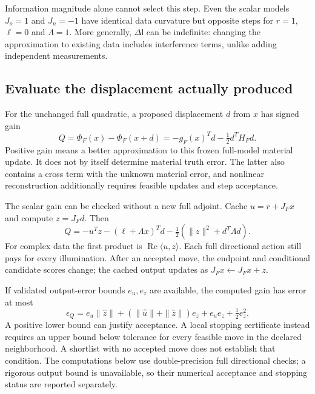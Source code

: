 Information magnitude alone cannot select this step. Even the scalar models $J_o=1$ and $J_n=-1$ have identical data curvature but opposite steps for $r=1$, $\ell=0$ and $\Lambda=1$. More generally, $\Delta\mathsf I$ can be indefinite: changing the approximation to existing data includes interference terms, unlike adding independent measurements.

\subsection{Evaluate the displacement actually produced}
For the unchanged full quadratic, a proposed displacement $d$ from $x$ has signed gain
\begin{equation}\label{eq:exchange-gain}
 Q=\Phi_F(x)-\Phi_F(x+d)=-g_F(x)^Td-\tfrac12d^TH_Fd.
\end{equation}
Positive gain means a better approximation to this frozen full-model material update. It does not by itself determine material truth error. The latter also contains a cross term with the unknown material error, and nonlinear reconstruction additionally requires feasible updates and step acceptance.

The scalar gain can be checked without a new full adjoint. Cache $u=r+J_Fx$ and compute $z=J_Fd$. Then
\begin{equation}\label{eq:directional-exchange-gain}
 Q=-u^Tz-(\ell+\Lambda x)^Td-\tfrac12(\|z\|^2+d^T\Lambda d).
\end{equation}
For complex data the first product is $\operatorname{Re}\langle u,z\rangle$. Each full directional action still pays for every illumination. After an accepted move, the endpoint and conditional candidate scores change; the cached output updates as $J_Fx\leftarrow J_Fx+z$.

If validated output-error bounds $e_u,e_z$ are available, the computed gain has error at most
\begin{equation}\label{eq:exchange-gain-bound}
 \epsilon_Q=e_u\|\widehat z\|+(\|\widehat u\|+\|\widehat z\|)e_z+e_ue_z+\tfrac12 e_z^2.
\end{equation}
A positive lower bound can justify acceptance. A local stopping certificate instead requires an upper bound below tolerance for every feasible move in the declared neighborhood. A shortlist with no accepted move does not establish that condition. The computations below use double-precision full directional checks; a rigorous output bound is unavailable, so their numerical acceptance and stopping status are reported separately.

